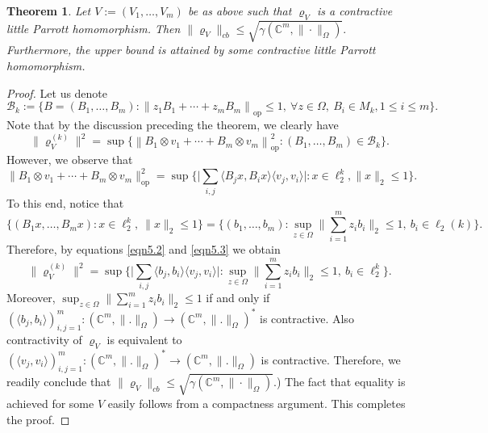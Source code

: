 \documentclass[a4paper,oneside,11pt, reqno]{amsart}
\numberwithin{equation}{section}
\newtheorem{theorem}{Theorem}[section]
\theoremstyle{plain}
\begin{document}
\begin{theorem}\label{thm5.17}
Let \( V:=(V_1,\dots, V_m) \) be as above such that $\varrho_V$ is a contractive little Parrott homomorphism. Then 
\( \|\varrho_V\|_{cb}\leq\sqrt{\gamma(\mathbb{C}^m,\|\cdot\|_{\Omega} )}.\) Furthermore, the upper bound is attained by some contractive little Parrott homomorphism.

\end{theorem}

\begin{proof}
Let us denote \[\mathcal{B}_k:=\{B=(B_1,\dots,B_m):\left\| z_1 B_1 + \cdots + z_m B_m \right\|_{\text{op}} \leq 1,\ \forall z \in \Omega,\ B_i\in M_k, 1\leq i\leq m\}.\]
Note that by the discussion preceding the theorem, we clearly have
\begin{equation}\label{eqn5.2}
\|\varrho_V^{(k)}\|^2=\sup\{\left\| B_1 \otimes v_1 + \cdots + B_m \otimes v_m \right\|_{\text{op}}^2:(B_1,\dots,B_m)\in\mathcal{B}_k\}.
\end{equation}
 However, we observe that 
 \begin{equation}\label{eqn5.3}\big \| B_1 \otimes v_1 + \cdots + B_m \otimes v_m \big \|_{\text{op}}^2=\sup \Big \{ \Big | \sum_{i,j} \langle B_jx, B_ix \rangle \langle v_j, v_i \rangle \Big |: x \in \ell_2^k, \|x\|_2 \leq 1 \Big \}. \end{equation} 
 To this end, notice that 
 \[\{(B_1x,\dots,B_mx):x\in \ell_2^k,\ \|x\|_2\leq 1\}=\Big \{(b_1,\dots,b_m):\sup_{z\in\Omega}\Big\|\sum_{i=1}^mz_ib_i\Big\|_2\leq 1,\ b_i\in \ell_2(k)\Big \}.\] Therefore, by equations \eqref{eqn5.2} and \eqref{eqn5.3} we obtain 
\[\|\varrho_V^{(k)}\|^2=\sup\Big \{\Big| \sum_{i,j} \langle b_j, b_i \rangle \langle v_j, v_i \rangle \Big |:\sup_{z\in\Omega}\Big\|\sum_{i=1}^mz_ib_i\Big\|_2\leq 1,\ b_i\in \ell_2^k\Big \}.\] Moreover, $\sup_{z\in\Omega}\Big\|\sum_{i=1}^mz_ib_i\Big\|_2\leq 1$ if and only if $(\langle b_j,b_i\rangle)_{i,j=1}^m:(\mathbb{C}^m,\|.\|_{\Omega})\to (\mathbb{C}^m,\|.\|_{\Omega})^*$ is contractive. Also contractivity of $\varrho_V$ is equivalent to $(\langle v_j,v_i\rangle)_{i,j=1}^m:(\mathbb{C}^m,\|.\|_{\Omega})^*\to (\mathbb{C}^m,\|.\|_{\Omega})$ is contractive. Therefore, we readily conclude that 
\( \|\varrho_V\|_{cb}\leq\sqrt{\gamma(\mathbb{C}^m,\|\cdot\|_{\Omega} )}.\)) The fact that equality is achieved for some $V$ easily follows from a compactness argument. This completes the proof.
\end{proof} 
\end{document}
